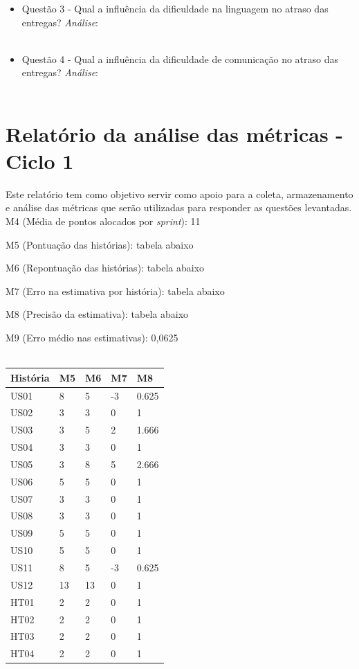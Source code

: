 \begin{apendicesenv}
\begin{itemize}
	  \item Questão 3 - Qual a influência da dificuldade na linguagem no atraso das entregas?
	    \subitem \textit{Análise}:
	  \\
	  \\
	  
	  \item Questão 4 - Qual a influência da dificuldade de comunicação no atraso das entregas?
	    \subitem \textit{Análise}:
	  \\
	  \\
	  
	\end{itemize}
	
	\chapter{Relatório da análise das métricas - Ciclo 1}
	\label{relatorio_1}

	Este relatório tem como objetivo servir como apoio para a coleta, armazenamento e análise das métricas que serão 
	utilizadas para responder as questões levantadas.
	\\
	

	M4 (Média de pontos alocados por \textit{sprint}): 11
	
	M5 (Pontuação das histórias): tabela abaixo
	
	M6 (Repontuação das histórias): tabela abaixo
	
	M7 (Erro na estimativa por história): tabela abaixo
	
	M8 (Precisão da estimativa): tabela abaixo
	
	M9 (Erro médio nas estimativas): 0,0625
	\\
	\\
	
\begin{tabular}{ | l | l | l | l | l | }
\hline
História & M5 & M6 & M7 & M8 \\ \hline
US01 & 8 & 5 & -3 & 0.625 \\ \hline
US02 & 3 & 3 & 0 & 1 \\ \hline
US03 & 3 & 5 & 2 & 1.666 \\ \hline
US04 & 3 & 3 & 0 & 1 \\ \hline
US05 & 3 & 8 & 5 & 2.666 \\ \hline
US06 & 5 & 5 & 0 & 1 \\ \hline
US07 & 3 & 3 & 0 & 1 \\ \hline
US08 & 3 & 3 & 0 & 1 \\ \hline
US09 & 5 & 5 & 0 & 1 \\ \hline
US10 & 5 & 5 & 0 & 1 \\ \hline
US11 & 8 & 5 & -3 & 0.625 \\ \hline
US12 & 13 & 13 & 0 & 1 \\ \hline
HT01 & 2 & 2 & 0 & 1 \\ \hline
HT02 & 2 & 2 & 0 & 1 \\ \hline
HT03 & 2 & 2 & 0 & 1 \\ \hline
HT04 & 2 & 2 & 0 & 1 \\ \hline
\end{tabular}
	

\end{apendicesenv}
